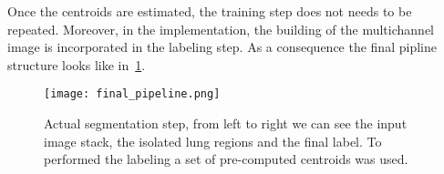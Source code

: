 \documentclass{standalone}
\begin{document}
	Once the centroids are estimated, the training step does not needs to be repeated. Moreover, in the implementation, the building of the multichannel image is incorporated in the labeling step. As a consequence the final pipline structure looks like in \figurename\,\ref{fig:FinalPipeline}.
	
	\begin{figure}[h!]
		\centering
		\texttt{[image: final\_pipeline.png]}
		\caption{Actual segmentation step, from left to right we can see the input image stack, the isolated lung regions and the final label. To performed the labeling a set of pre-computed centroids was used.}\label{fig:FinalPipeline}
	\end{figure}
	
	
	
	
	
	
	
	
\end{document}
